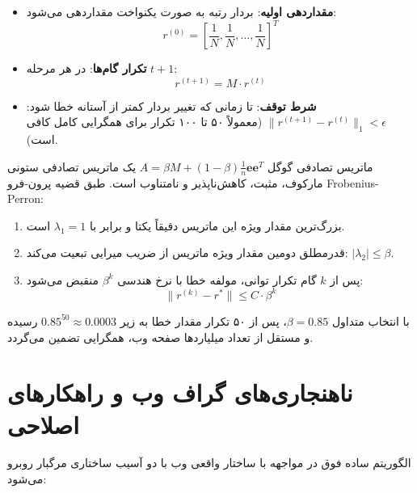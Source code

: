 \begin{algorithmbox}
\begin{itemize}
    \item \textbf{مقداردهی اولیه}: بردار رتبه به صورت یکنواخت مقداردهی می‌شود:
    \begin{equation}
    r^{(0)} = \left[ \frac{1}{N}, \frac{1}{N}, \dots, \frac{1}{N} \right]^T
    \end{equation}
    \item \textbf{تکرار گام‌ها}: در هر مرحله $t+1$:
    \begin{equation}
    r^{(t+1)} = M \cdot r^{(t)}
    \end{equation}
    \item \textbf{شرط توقف}: تا زمانی که تغییر بردار کمتر از آستانه خطا شود: $\|r^{(t+1)} - r^{(t)}\|_1 < \epsilon$ (معمولاً ۵۰ تا ۱۰۰ تکرار برای همگرایی کامل کافی است).
\end{itemize}
\end{algorithmbox}

\begin{theorem}
ماتریس تصادفی گوگل $A = \beta M + (1 - \beta) \frac{1}{n} \mathbf{e} \mathbf{e}^T$ یک ماتریس تصادفی ستونی مارکوف، مثبت، کاهش‌ناپذیر و نامتناوب است. طبق قضیه پرون-فرو Frobenius-Perron:
\begin{enumerate}
    \item بزرگ‌ترین مقدار ویژه این ماتریس دقیقاً یکتا و برابر با $\lambda_1 = 1$ است.
    \item قدرمطلق دومین مقدار ویژه ماتریس از ضریب میرایی تبعیت می‌کند: $|\lambda_2| \le \beta$.
    \item پس از $k$ گام تکرار توانی، مولفه خطا با نرخ هندسی $\beta^k$ منقبض می‌شود:
    \begin{equation}
    \|r^{(k)} - r^*\| \le C \cdot \beta^k
    \end{equation}
\end{enumerate}
با انتخاب متداول $\beta = 0.85$، پس از ۵۰ تکرار مقدار خطا به زیر $0.85^{50} \approx 0.0003$ رسیده و مستقل از تعداد میلیاردها صفحه وب، همگرایی تضمین می‌گردد.
\end{theorem}

\section{ناهنجاری‌های گراف وب و راهکارهای اصلاحی}
الگوریتم ساده فوق در مواجهه با ساختار واقعی وب با دو آسیب ساختاری مرگبار روبرو می‌شود:

